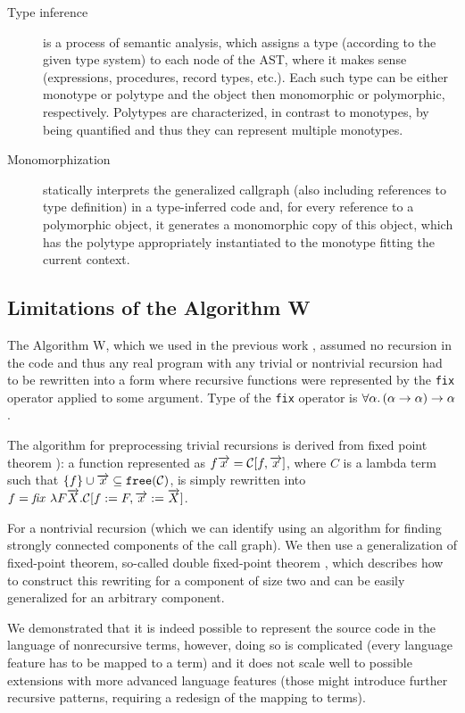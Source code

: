 \begin{description}
\item[Type inference] is a process of semantic analysis, which assigns a type (according to the given type system) to each node of the AST, where it makes sense (expressions, procedures, record types, etc.). Each such type can be either monotype or polytype and the object then monomorphic or polymorphic, respectively. Polytypes are characterized, in contrast to monotypes, by being quantified and thus they can represent multiple monotypes.

\item[Monomorphization] statically interprets the generalized callgraph (also including references to type definition) in a type-inferred code and, for every reference to a polymorphic object, it generates a monomorphic copy of this object, which has the polytype appropriately instantiated to the monotype fitting the current context.
\end{description}

\subsection{Limitations of the Algorithm W}

The Algorithm W, which we used in the previous work \cite{klepl2020type}, assumed no recursion in the code and thus any real program with any trivial or nontrivial recursion had to be rewritten into a form where recursive functions were represented by the \lstinline{fix} operator applied to some argument. Type of the \lstinline{fix} operator is $\forall \alpha . \left(\alpha \to \alpha\right) \to \alpha$.

The algorithm for preprocessing trivial recursions is derived from fixed point theorem \cite{barendregt1992lambda,damas1982principal}): a function represented as $f \overrightarrow{x} = \mathcal{C}[f, \overrightarrow{x}]$, where $C$ is a lambda term such that $\{f\} \cup \overrightarrow{x} \subseteq \mathtt{free} (\mathcal{C})$, is simply rewritten into $f = \mathit{fix}\ \lambda F \overrightarrow{X} .\mathcal{C}[f := F, \overrightarrow{x} := \overrightarrow{X}]$.

For a nontrivial recursion (which we can identify using an algorithm for finding strongly connected components of the call graph). We then use a generalization of fixed-point theorem, so-called double fixed-point theorem \cite{stepanek}, which describes how to construct this rewriting for a component of size two and can be easily generalized for an arbitrary component.

We demonstrated that it is indeed possible to represent the source code in the language of nonrecursive terms, however, doing so is complicated (every language feature has to be mapped to a term) and it does not scale well to possible extensions with more advanced language features (those might introduce further recursive patterns, requiring a redesign of the mapping to terms).

